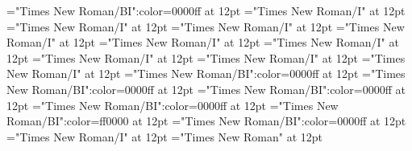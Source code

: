 \documentclass[a4paper]{article}
\begin{document}
 
\pagestyle{plain} 
\font\exampleusefirstoftypelastoftypesensearticlesectionletter="Times New Roman/BI":color=0000ff at 12pt
\font\lastoftypevariantinflectionarticlesectionletter="Times New Roman/I" at 12pt
\font\variantinflectionarticlesectionletter="Times New Roman/I" at 12pt
\font\firstoftypevariantinflectionarticlesectionletter="Times New Roman/I" at 12pt
\font\firstoftypelastoftypestressfirstoftypelastoftypepronunciationarticlesectionletter="Times New Roman/I" at 12pt
\font\firstoftypelastoftypepronunciationarticlesectionletter="Times New Roman/I" at 12pt
\font\firstoftypeheadwordlastoftypearticlesectionletter="Times New Roman/I" at 12pt
\font\examplefirstoftypelastoftypesubentryarticlesectionletter="Times New Roman/I" at 12pt
\font\firstoftypeheadwordlastoftypefirstoftypelastoftypesubentryarticlesectionletter="Times New Roman/I" at 12pt
\font\firstoftypelastoftypesubentryarticlesectionletter="Times New Roman/I" at 12pt
\font\examplesensearticlesectionletter="Times New Roman/BI":color=0000ff at 12pt
\font\firstoftypelastoftypewordusedefinitionfirstoftypelastoftypesensearticlesectionletter="Times New Roman/BI":color=0000ff at 12pt
\font{}="Times New Roman/BI":color=0000ff at 12pt
\font\firstoftypegrammarcategorylastoftypesensearticlesectionletter="Times New Roman/BI":color=0000ff at 12pt
\font\sensebeforearticlesectionletter="Times New Roman/BI":color=ff0000 at 12pt
\font\sensearticlesectionletter="Times New Roman/BI":color=0000ff at 12pt
\font\articlesectionletter="Times New Roman/I" at 12pt
\font\sectionletter="Times New Roman" at 12pt
\pagestyle{fancy} 
\end{document}
